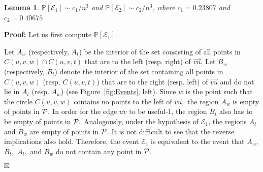 \documentclass {journal}
\newtheorem {lemma} {Lemma}
\newenvironment {proof}{\textbf {Proof:}}{\hfill \ensuremath {\boxtimes}}
\newcommand{\Pts}{\cal P}
\newcommand{\bP}{{\mathbb P}}
\begin{document}
\begin{lemma}\label{lem_e1_e2}
$\bP[\mathcal{E}_1]\sim c_1/n^3$ and $\bP[\mathcal{E}_2] \sim c_2/n^3$, where $c_1 \stackrel{\cdot}{=} 0.23807$ and $c_2 \stackrel{\cdot}{=} 0.40675$.
\end{lemma}
\begin{proof}
Let us first compute $\bP[\mathcal{E}_1].$

Let $A_w$ (respectively, $A_t$)  be the interior of the set
consisting of all points in $C(u,v,w)\cap C(u,v,t)$ that are to
the left (resp. right) of $\overrightarrow{vu}.$ Let $B_w$
(respectively, $B_t$) denote the interior of the set containing
all points in $C(u,v,w)$ (resp. $C(u,v,t)$) that are to the right
(resp. left) of $\overrightarrow{vu}$ and do not lie in $A_t$
(resp. $A_w$) (see Figure~\ref{fig:Events}, left).
 Since $w$ is the point such that the
circle $C(u,v,w)$ contains no points to the left of
$\overrightarrow{vu},$ the region $A_w$ is empty of points in
$\Pts.$ In order for the edge $\overline{uv}$ to be useful-1, the region $B_t$ also has to be empty of points in $\Pts.$
Analogously, under the hypothesis of $\mathcal{E}_1$, the regions
$A_t$ and $B_w$ are empty of points in $\Pts.$ It is not
difficult to see that the reverse implications also hold.
Therefore, the event $\mathcal{E}_1$ is equivalent to the event
that $A_w,$ $B_t,$ $A_t,$ and $B_w$ do not contain any point in
$\Pts.$


\end{proof}
\end{document}
